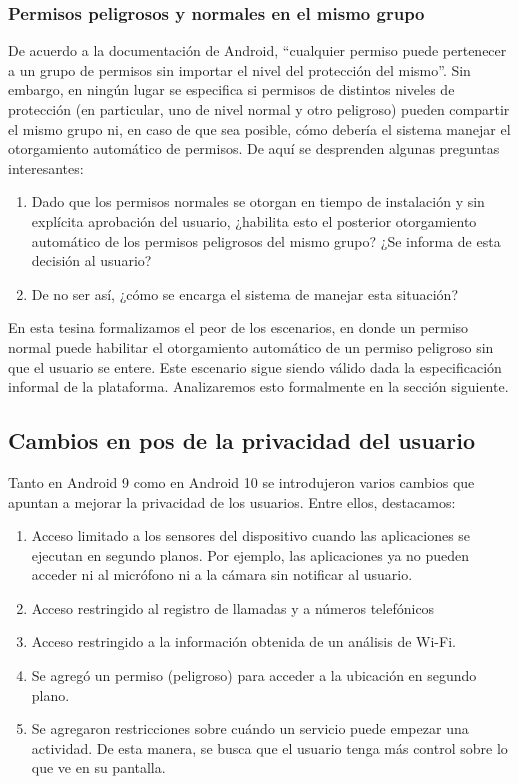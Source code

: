 \subsubsection{Permisos peligrosos y normales en el mismo grupo}
De acuerdo a la documentación de Android, ``cualquier permiso puede pertenecer a un grupo de
permisos sin importar el nivel del protección del mismo''\cite{android-permissions}. Sin embargo, en
ningún lugar se especifica si permisos de distintos niveles de protección (en particular, uno de
nivel normal y otro peligroso) pueden compartir el mismo grupo ni, en caso de que sea posible, cómo
debería el sistema manejar el otorgamiento automático de permisos. De aquí se desprenden algunas
preguntas interesantes:
\begin{enumerate}
    \item Dado que los permisos normales se otorgan en tiempo de instalación y sin explícita
          aprobación del usuario, ¿habilita esto el posterior otorgamiento automático de los
          permisos peligrosos del mismo grupo? ¿Se informa de esta decisión al usuario?
    \item De no ser así, ¿cómo se encarga el sistema de manejar esta situación?
\end{enumerate}
En esta tesina formalizamos el peor de los escenarios, en donde un permiso normal puede habilitar el
otorgamiento automático de un permiso peligroso sin que el usuario se entere. Este escenario sigue
siendo válido dada la especificación informal de la plataforma. Analizaremos esto formalmente en la
sección siguiente.


\subsection{Cambios en pos de la privacidad del usuario}
Tanto en Android 9 como en Android 10 se introdujeron varios cambios que apuntan a mejorar la
privacidad de los usuarios. Entre ellos, destacamos:
\begin{enumerate}
    \item Acceso limitado a los sensores del dispositivo cuando las aplicaciones se ejecutan en
          segundo planos. Por ejemplo, las aplicaciones ya no pueden acceder ni al micrófono ni a la
          cámara sin notificar al usuario.
    \item Acceso restringido al registro de llamadas y a números telefónicos
    \item Acceso restringido a la información obtenida de un análisis de Wi-Fi.
    \item Se agregó un permiso (peligroso) para acceder a la ubicación en segundo plano.
    \item Se agregaron restricciones sobre cuándo un servicio puede empezar una actividad. De esta
          manera, se busca que el usuario tenga más control sobre lo que ve en su pantalla.
\end{enumerate}

